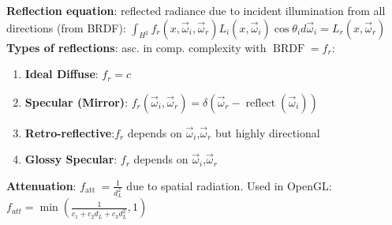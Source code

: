 \textbf{Reflection equation}: reflected radiance due to incident illumination from all directions (from BRDF): $\int_{H^2} f_r\left(x, \vec{\omega}_i, \vec{\omega}_r\right) L_i\left(x, \vec{\omega}_i\right) \cos \theta_i d \vec{\omega}_i=L_r\left(x, \vec{\omega}_r\right)$\\
\textbf{Types of reflections}: asc.  in comp. complexity with $\operatorname{BRDF}=f_r$:
\begin{enumerate}[leftmargin = *,noitemsep]
\item \textbf{Ideal Diffuse}: $f_r = c$ 
\item \textbf{Specular (Mirror)}: $f_r\left(\vec{\omega}_i, \vec{\omega}_r\right)=\delta\left(\vec{\omega}_r-\operatorname{reflect}\left(\vec{\omega}_i\right)\right)$
\item \textbf{Retro-reflective}:$f_r$ depends on $\vec{\omega}_i$,$\vec{\omega}_r$  but highly directional 
\item \textbf{Glossy Specular}: $f_r$ depends on $\vec{\omega}_i$,$\vec{\omega}_r$ 
\end{enumerate}
\textbf{Attenuation}: $f_{\text {att }}=\frac{1}{d_L^2}$ due to spatial radiation. Used in OpenGL: $f_{a t t}=\min \left(\frac{1}{c_1+c_2 d_L+c_3 d_L^2}, 1\right)$

